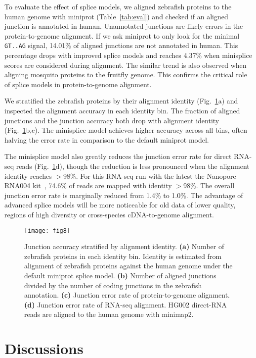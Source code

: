 \documentclass[webpdf,contemporary,large,namedate]{oup-authoring-template}%
\begin{document}
To evaluate the effect of splice models,
we aligned zebrafish proteins to the human genome with miniprot (Table~\ref{tab:eval})
and checked if an aligned junction is annotated in human.
Unannotated junctions are likely errors in the protein-to-genome alignment.
If we ask miniprot to only look for the minimal {\tt GT..AG} signal, 14.01\% of aligned junctions are not annotated in human.
This percentage drops with improved splice models
and reaches 4.37\% when minisplice scores are considered during alignment.
The similar trend is also observed when aligning mosquito proteins to the fruitfly genome.
This confirms the critical role of splice models in protein-to-genome alignment.

We stratified the zebrafish proteins by their alignment identity (Fig.~\ref{fig:map}a)
and inspected the alignment accuracy in each identity bin.
The fraction of aligned junctions and the junction accuracy both drop with alignment identity (Fig.~\ref{fig:map}b,c).
The minisplice model achieves higher accuracy across all bins, often halving the error rate in comparison to the default miniprot model.

The minisplice model also greatly reduces the junction error rate for direct RNA-seq reads (Fig.~\ref{fig:map}d),
though the reduction is less pronounced when the alignment identity reaches $>$98\%.
For this RNA-seq run with the latest the Nanopore RNA004 kit~\citep{Zheng2024.11.17.624050}, 74.6\% of reads are mapped with identity $>$98\%.
The overall junction error rate is marginally reduced from 1.4\% to 1.0\%.
The advantage of advanced splice models will be more noticeable for old data of lower quality, regions of high diversity or cross-species cDNA-to-genome alignment.

\begin{figure}[bt]
\texttt{[image: fig8]}
\caption{Junction accuracy stratified by alignment identity.
{\bf (a)} Number of zebrafish proteins in each identity bin.
Identity is estimated from alignment of zebrafish proteins against the human genome under the default miniprot splice model.
{\bf (b)} Number of aligned junctions divided by the number of coding junctions in the zebrafish annotation.
{\bf (c)} Junction error rate of protein-to-genome alignment.
{\bf (d)} Junction error rate of RNA-seq alignment.
HG002 direct-RNA reads are aligned to the human genome with minimap2.}\label{fig:map}
\end{figure}

\section{Discussions}
\end{document}
